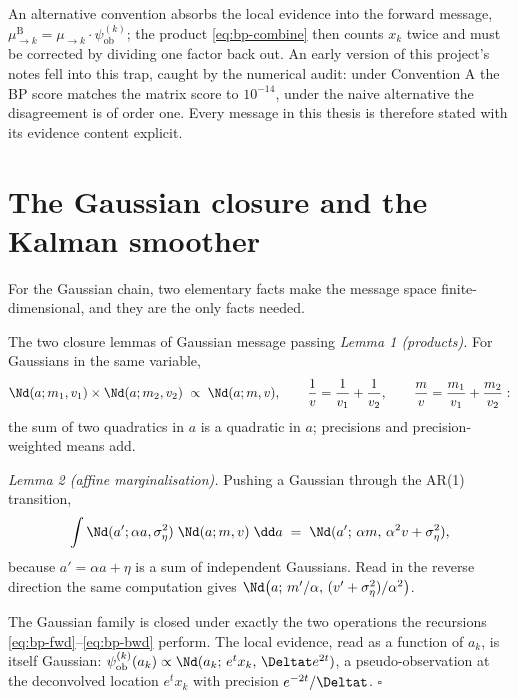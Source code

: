 \begin{remark}\label{rmk:bp-trap}
An alternative convention absorbs the local evidence into the forward
message, $\mu^{\mathrm{B}}_{\to k} = \mu_{\to k} \cdot
\psi^{(k)}_{\mathrm{ob}}$; the product \eqref{eq:bp-combine} then counts
$x_k$ twice and must be corrected by dividing one factor back out. An
early version of this project's notes fell into this trap, caught by the
numerical audit: under Convention A the BP score matches the matrix score
to $10^{-14}$, under the naive alternative the disagreement is of order
one. Every message in this thesis is therefore stated with its evidence
content explicit.
\end{remark}

\section{The Gaussian closure and the Kalman smoother}
\label{sec:bp-gaussian}\label{sec:bp-kalman}

For the Gaussian chain, two elementary facts make the message space
finite-dimensional, and they are the only facts needed.

\begin{toolbox}{The two closure lemmas of Gaussian message passing}
\emph{Lemma 1 (products).} For Gaussians in the same variable,
\begin{equation*}
  \Nd(a; m_1, v_1) \times \Nd(a; m_2, v_2)
  \;\propto\; \Nd(a; m, v),
  \qquad
  \frac{1}{v} = \frac{1}{v_1} + \frac{1}{v_2},
  \qquad
  \frac{m}{v} = \frac{m_1}{v_1} + \frac{m_2}{v_2} :
\end{equation*}
the sum of two quadratics in $a$ is a quadratic in $a$; precisions and
precision-weighted means add.

\emph{Lemma 2 (affine marginalisation).} Pushing a Gaussian through the
AR(1) transition,
\begin{equation*}
  \int \Nd(a'; \alpha a, \sigma_\eta^2)\; \Nd(a; m, v)\; \dd a
  \;=\; \Nd(a';\, \alpha m,\, \alpha^2 v + \sigma_\eta^2),
\end{equation*}
because $a' = \alpha a + \eta$ is a sum of independent Gaussians. Read in
the reverse direction the same computation gives
$\Nd\big(a;\, m'/\alpha,\, (v' + \sigma_\eta^2)/\alpha^2\big)$.

The Gaussian family is closed under exactly the two operations the
recursions \eqref{eq:bp-fwd}--\eqref{eq:bp-bwd} perform. The local
evidence, read as a function of $a_k$, is itself Gaussian:
$\psi^{(k)}_{\mathrm{ob}}(a_k) \propto
\Nd(a_k;\, e^{t} x_k,\, \Deltat e^{2t})$, a pseudo-observation at the
deconvolved location $e^t x_k$ with precision $e^{-2t}/\Deltat$.
\hfill$\square$
\end{toolbox}

